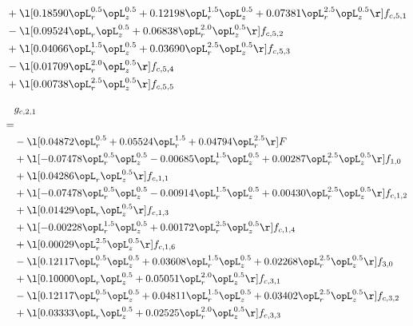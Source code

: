 \begin{alignat}{2}
& + \l[  0.18590 \opL_r^{0.5} \opL_z^{0.5} +  0.12198 \opL_r^{1.5} \opL_z^{0.5} +  0.07381 \opL_r^{2.5} \opL_z^{0.5}  \r] f_{c,5,1} \nonumber \\ 
& - \l[  0.09524 \opL_r \opL_z^{0.5} +  0.06838 \opL_r^{2.0} \opL_z^{0.5}  \r] f_{c,5,2} \nonumber \\ 
& + \l[  0.04066 \opL_r^{1.5} \opL_z^{0.5} +  0.03690 \opL_r^{2.5} \opL_z^{0.5}  \r] f_{c,5,3} \nonumber \\ 
& - \l[  0.01709 \opL_r^{2.0} \opL_z^{0.5}  \r] f_{c,5,4} \nonumber \\ 
& + \l[  0.00738 \opL_r^{2.5} \opL_z^{0.5}  \r] f_{c,5,5} \nonumber \\ 
\end{alignat} 


\begin{alignat}{2} 
\label{eq:g_21_0} 
& g_{c,2,1} \nonumber \\ 
 = \\ 
& - \l[  0.04872 \opL_r^{0.5} +  0.05524 \opL_r^{1.5} +  0.04794 \opL_r^{2.5}  \r] F \nonumber \\ 
& + \l[  -0.07478 \opL_r^{0.5} \opL_z^{0.5}   -0.00685 \opL_r^{1.5} \opL_z^{0.5} +  0.00287 \opL_r^{2.5} \opL_z^{0.5}  \r] f_{1,0} \nonumber \\ 
& + \l[  0.04286 \opL_r \opL_z^{0.5}  \r] f_{c,1,1} \nonumber \\ 
& + \l[  -0.07478 \opL_r^{0.5} \opL_z^{0.5}   -0.00914 \opL_r^{1.5} \opL_z^{0.5} +  0.00430 \opL_r^{2.5} \opL_z^{0.5}  \r] f_{c,1,2} \nonumber \\ 
& + \l[  0.01429 \opL_r \opL_z^{0.5}  \r] f_{c,1,3} \nonumber \\ 
& + \l[  -0.00228 \opL_r^{1.5} \opL_z^{0.5} +  0.00172 \opL_r^{2.5} \opL_z^{0.5}  \r] f_{c,1,4} \nonumber \\ 
& + \l[  0.00029 \opL_r^{2.5} \opL_z^{0.5}  \r] f_{c,1,6} \nonumber \\ 
& - \l[  0.12117 \opL_r^{0.5} \opL_z^{0.5} +  0.03608 \opL_r^{1.5} \opL_z^{0.5} +  0.02268 \opL_r^{2.5} \opL_z^{0.5}  \r] f_{3,0} \nonumber \\ 
& + \l[  0.10000 \opL_r \opL_z^{0.5} +  0.05051 \opL_r^{2.0} \opL_z^{0.5}  \r] f_{c,3,1} \nonumber \\ 
& - \l[  0.12117 \opL_r^{0.5} \opL_z^{0.5} +  0.04811 \opL_r^{1.5} \opL_z^{0.5} +  0.03402 \opL_r^{2.5} \opL_z^{0.5}  \r] f_{c,3,2} \nonumber \\ 
& + \l[  0.03333 \opL_r \opL_z^{0.5} +  0.02525 \opL_r^{2.0} \opL_z^{0.5}  \r] f_{c,3,3} \nonumber \\ 

\end{alignat}
